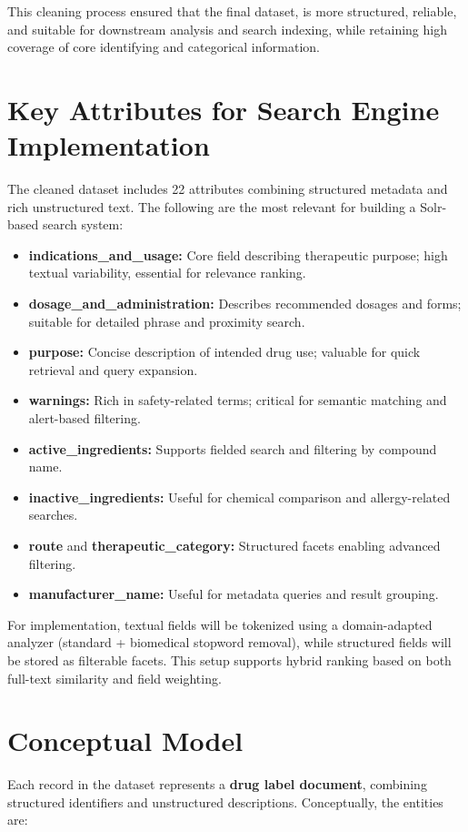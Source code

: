 This cleaning process ensured that the final dataset, is more structured, reliable, and suitable for downstream analysis and search indexing, while retaining high coverage of core identifying and categorical information.

\section{Key Attributes for Search Engine Implementation}
The cleaned dataset includes 22 attributes combining structured metadata and rich unstructured text. The following are the most relevant for building a Solr-based search system:

\begin{itemize}
  \item \textbf{indications\_and\_usage:} Core field describing therapeutic purpose; high textual variability, essential for relevance ranking.
  \item \textbf{dosage\_and\_administration:} Describes recommended dosages and forms; suitable for detailed phrase and proximity search.
  \item \textbf{purpose:} Concise description of intended drug use; valuable for quick retrieval and query expansion.
  \item \textbf{warnings:} Rich in safety-related terms; critical for semantic matching and alert-based filtering.
  \item \textbf{active\_ingredients:} Supports fielded search and fil\-tering by compound name.
  \item \textbf{inactive\_ingredients:} Useful for chemical comparison and allergy-related searches.
  \item \textbf{route} and \textbf{therapeutic\_category:} Structured facets enabling advanced filtering.
  \item \textbf{manufacturer\_name:} Useful for metadata queries and result grouping.
\end{itemize}

For implementation, textual fields will be tokenized using a domain-adapted analyzer (standard + bio\-medical stopword removal), while structured fields will be stored as filterable facets. This setup supports hybrid ranking based on both full-text similarity and field weighting.

\section{Conceptual Model}
Each record in the dataset represents a \textbf{drug label document}, combining structured identifiers and unstructured descriptions. Conceptually, the entities are:

